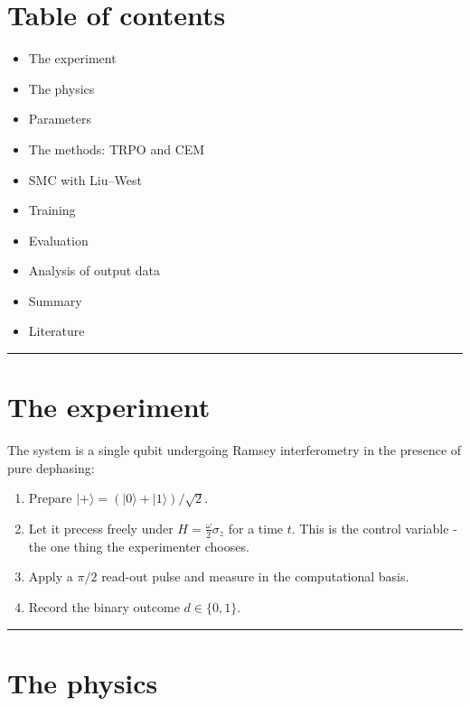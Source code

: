 \documentclass[12pt,a4paper]{article}
\begin{document}
\section*{Table of contents}
\begin{itemize}
  \item The experiment
  \item The physics
  \item Parameters
  \item The methods: TRPO and CEM
  \item SMC with Liu--West
  \item Training
  \item Evaluation
  \item Analysis of output data
  \item Summary
  \item Literature
\end{itemize}

\noindent\rule{\textwidth}{0.4pt}
\FloatBarrier

\section{The experiment}
\label{sec:the-experiment}
The system is a single qubit undergoing Ramsey interferometry in the presence of pure dephasing:

\begin{enumerate}
  \item Prepare $|+\rangle = (|0\rangle + |1\rangle)/\sqrt{2}$.
  \item Let it precess freely under $H = \tfrac{\omega}{2}\sigma_z$ for a time $t$. This is the
  control variable - the one thing the experimenter chooses.
  \item Apply a $\pi/2$ read-out pulse and measure in the computational basis.
  \item Record the binary outcome $d \in \{0, 1\}$.
\end{enumerate}


\noindent\rule{\textwidth}{0.4pt}
\FloatBarrier

\section{The physics}
\label{sec:the-physics}
\end{document}
